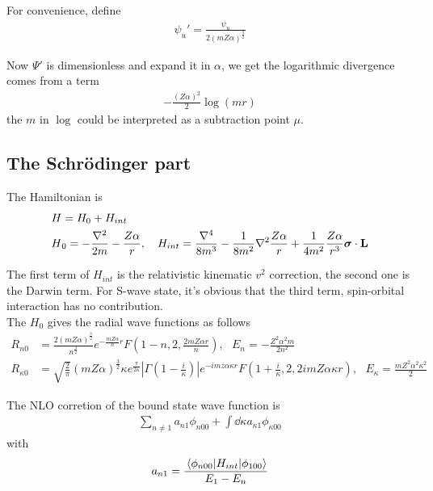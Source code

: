 \documentclass{article}
\renewcommand{\a}{\alpha}
\newcommand{\ka}{\kappa}
\newcommand{\s}{\sigma}
\begin{document}
For convenience, define
\begin{align}
	\psi_u '=\frac{\psi_u}{2(mZ\alpha)^\frac{3}{2}}
\end{align}

Now $\Psi '$ is dimensionless and expand it in $\alpha$, we get the logarithmic divergence comes from a term
\begin{align}
	-\frac{(Z\alpha)^2}{2}\log(m r)
\end{align}
the $m$ in $\log$ could be interpreted as a subtraction point $\mu$.

\subsection{The Schr\"odinger part}

The Hamiltonian is
\begin{align}
	H & =H_0+H_{int}                                                                                                                                                      \\
	H & _0=-\frac{\nabla^2}{2m}-\frac{Z\alpha}{r},\ \ \ H_{int}=\frac{\nabla^4}{8m^3}-\frac{1}{8m^2}\nabla^2\frac{Z\a}{r}+\frac{1}{4m^2}\frac{Z\a}{r^3}\bm{\s}\cdot\vb{L}
\end{align}

The first term of $H_{int}$ is the relativistic kinematic $v^2$ correction, the second one is the Darwin term. For S-wave state, it's obvious that the third term, spin-orbital interaction has no contribution. \\
The $H_0$ gives the radial wave functions as follows
\begin{align}
	R_{n0}      & =\frac{2(mZ\alpha)^\frac{3}{2}}{n^\frac{3}{2}}e^{-\frac{mZ\alpha}{n}r}F(1-n,2,\frac{2mZ\alpha r}{n}),\ \ \ E_n=-\frac{Z^2\alpha^2m}{2n^2}                                                                           \\
	R_{\kappa0} & =\sqrt{\frac{2}{\pi}}(mZ\alpha)^\frac{3}{2}\kappa e^\frac{\pi}{2\kappa}|\Gamma(1-\frac{i}{\kappa})|e^{-imz\alpha \kappa r}F(1+\frac{i}{\kappa},2,2imZ\alpha \kappa r),\ \ \ E_\kappa=\frac{mZ^2\alpha^2\kappa^2}{2}
\end{align}

The NLO corretion of the bound state wave function is
\begin{align}
	\sum_{n\neq 1}a_{n1}\phi_{n00}+\int \dd\ka a_{\ka1}\phi_{\ka00}
\end{align}
with
\begin{align}
	a_{n1}=\frac{\mel{\phi_{n00}}{H_{int}}{\phi_{100}}}{E_1-E_n}
\end{align}
\end{document}
